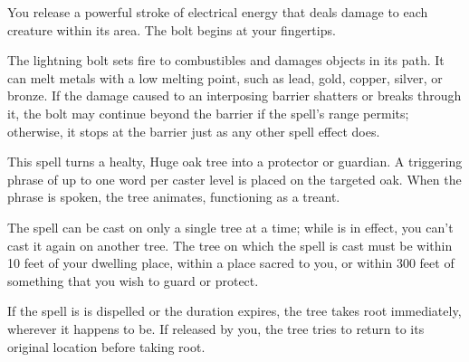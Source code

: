 \begin{spelleffect}
  You release a powerful stroke of electrical energy that deals damage to each creature within its area. The bolt begins at your fingertips.
  \par The lightning bolt sets fire to combustibles and damages objects in its path. It can melt metals with a low melting point, such as lead, gold, copper, silver, or bronze. If the damage caused to an interposing barrier shatters or breaks through it, the bolt may continue beyond the barrier if the spell's range permits; otherwise, it stops at the barrier just as any other spell effect does.
\end{spelleffect}

\begin{spelleffect}
This spell turns a healty, Huge oak tree into a protector or guardian. A triggering phrase of up to one word per caster level is placed on the targeted oak. When the phrase is spoken, the tree animates, functioning as a treant.
\par The spell can be cast on only a single tree at a time; while  is in effect, you can't cast it again on another tree. The tree on which the spell is cast must be within 10 feet of your dwelling place, within a place sacred to you, or within 300 feet of something that you wish to guard or protect.
\end{spelleffect}
\begin{spellnotes}
If the spell is is dispelled or the duration expires, the tree takes root immediately, wherever it happens to be. If released by you, the tree tries to return to its original location before taking root.
\end{spellnotes}

